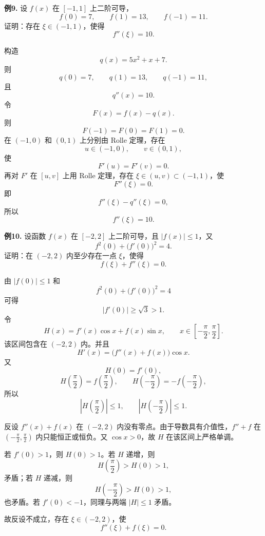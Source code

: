 \begin{problemblock}
\textbf{例9.} 设 \(f(x)\) 在 \([-1,1]\) 上二阶可导，
\[
f(0)=7,\qquad f(1)=13,\qquad f(-1)=11.
\]
证明：存在 \(\xi\in(-1,1)\)，使得
\[
f''(\xi)=10.
\]
\end{problemblock}
\begin{solutionblock}
构造
\[
q(x)=5x^2+x+7.
\]
则
\[
q(0)=7,\qquad q(1)=13,\qquad q(-1)=11,
\]
且
\[
q''(x)=10.
\]
令
\[
F(x)=f(x)-q(x).
\]
则
\[
F(-1)=F(0)=F(1)=0.
\]
在 \((-1,0)\) 和 \((0,1)\) 上分别由 Rolle 定理，存在
\[
u\in(-1,0),\qquad v\in(0,1),
\]
使
\[
F'(u)=F'(v)=0.
\]
再对 \(F'\) 在 \([u,v]\) 上用 Rolle 定理，存在 \(\xi\in(u,v)\subset(-1,1)\)，使
\[
F''(\xi)=0.
\]
即
\[
f''(\xi)-q''(\xi)=0,
\]
所以
\[
f''(\xi)=10.
\]
\end{solutionblock}

\begin{problemblock}
\textbf{例10.} 设函数 \(f(x)\) 在 \([-2,2]\) 上二阶可导，且 \(|f(x)|\le1\)，又
\[
f^2(0)+\bigl(f'(0)\bigr)^2=4.
\]
证明：在 \((-2,2)\) 内至少存在一点 \(\xi\)，使得
\[
f(\xi)+f''(\xi)=0.
\]
\end{problemblock}
\begin{solutionblock}
由 \(|f(0)|\le1\) 和
\[
f^2(0)+\bigl(f'(0)\bigr)^2=4
\]
可得
\[
\bigl|f'(0)\bigr|\ge\sqrt3>1.
\]
令
\[
H(x)=f'(x)\cos x+f(x)\sin x,\qquad x\in\left[-\frac\pi2,\frac\pi2\right].
\]
该区间包含在 \((-2,2)\) 内。并且
\[
H'(x)=\bigl(f''(x)+f(x)\bigr)\cos x.
\]
又
\[
H(0)=f'(0),
\]
\[
H\left(\frac\pi2\right)=f\left(\frac\pi2\right),\qquad
H\left(-\frac\pi2\right)=-f\left(-\frac\pi2\right),
\]
所以
\[
\left|H\left(\frac\pi2\right)\right|\le1,\qquad
\left|H\left(-\frac\pi2\right)\right|\le1.
\]

反设 \(f''(x)+f(x)\) 在 \((-2,2)\) 内没有零点。由于导数具有介值性，\(f''+f\) 在 \(\left(-\frac\pi2,\frac\pi2\right)\) 内只能恒正或恒负。又 \(\cos x>0\)，故 \(H\) 在该区间上严格单调。

若 \(f'(0)>1\)，则 \(H(0)>1\)。若 \(H\) 递增，则
\[
H\left(\frac\pi2\right)>H(0)>1,
\]
矛盾；若 \(H\) 递减，则
\[
H\left(-\frac\pi2\right)>H(0)>1,
\]
也矛盾。若 \(f'(0)<-1\)，同理与两端 \(|H|\le1\) 矛盾。

故反设不成立，存在 \(\xi\in(-2,2)\)，使
\[
f''(\xi)+f(\xi)=0.
\]
\end{solutionblock}

